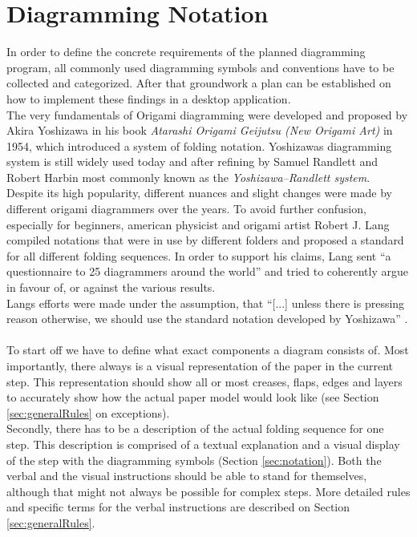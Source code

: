 
\section{Diagramming Notation}
\label{sec:conventions}


In order to define the concrete requirements of the planned diagramming program, all commonly used diagramming symbols and conventions have to be collected and categorized. After that groundwork a plan can be established on how to implement these findings in a desktop application.\\
The very fundamentals of Origami diagramming were developed and proposed by Akira Yoshizawa in his book \emph{Atarashi Origami Geijutsu (New Origami Art)}\cite{Yoshizawa} in 1954, which introduced a system of folding notation. Yoshizawas diagramming system is still widely used today and after refining by Samuel Randlett and Robert Harbin most commonly known as the \emph{Yoshizawa–Randlett system}.\\
Despite its high popularity, different nuances and slight changes were made by different origami diagrammers over the years.  To avoid further confusion, especially for beginners, american physicist and origami artist Robert J. Lang compiled notations that were in use by different folders and proposed a standard for all different folding sequences. In order to support his claims, Lang sent \enquote{a questionnaire to 25 diagrammers around the world}\cite{Lang} and tried to coherently argue in favour of, or against the various results.\\
Langs efforts were made under the assumption, that \enquote{[...] unless there is pressing reason otherwise, we should use the standard notation developed by Yoshizawa} \cite{Lang}.\\
\\
To start off we have to define what exact components a diagram consists of. Most importantly, there always is a visual representation of the paper in the current step. This representation should show all or most creases, flaps, edges and layers to accurately show how the actual paper model would look like (see Section \ref{sec:generalRules} on exceptions).\\
Secondly, there has to be a description of the actual folding sequence for one step. This description is comprised of a textual explanation and a visual display of the step with the diagramming symbols (Section \ref{sec:notation}). Both the verbal and the visual instructions should be able to stand for themselves, although that might not always be possible for complex steps. More detailed rules and specific terms for the verbal instructions are described on Section \ref{sec:generalRules}.

